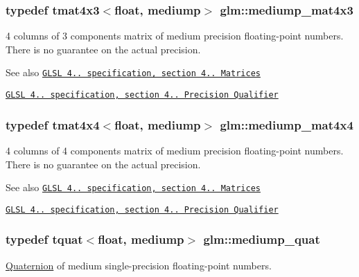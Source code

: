 \subsubsection[{mediump\+\_\+mat4x3}]{\setlength{\rightskip}{0pt plus 5cm}typedef tmat4x3$<$float, mediump$>$ {\bf glm\+::mediump\+\_\+mat4x3}}\label{namespaceglm_a25249273959c0b7c96e981ffdcd17dde}
4 columns of 3 components matrix of medium precision floating-\/point numbers. There is no guarantee on the actual precision.

\begin{DoxySeeAlso}{See also}
\href{http://www.opengl.org/registry/doc/GLSLangSpec.4.20.8.pdf}{\tt G\+L\+S\+L 4.. specification, section 4.. Matrices} 

\href{http://www.opengl.org/registry/doc/GLSLangSpec.4.20.8.pdf}{\tt G\+L\+S\+L 4.. specification, section 4.. Precision Qualifier} 
\end{DoxySeeAlso}
\hypertarget{namespaceglm_a8f7eeb38136787454a3a0fe6586d990b}{}
\subsubsection[{mediump\+\_\+mat4x4}]{\setlength{\rightskip}{0pt plus 5cm}typedef tmat4x4$<$float, mediump$>$ {\bf glm\+::mediump\+\_\+mat4x4}}\label{namespaceglm_a8f7eeb38136787454a3a0fe6586d990b}
4 columns of 4 components matrix of medium precision floating-\/point numbers. There is no guarantee on the actual precision.

\begin{DoxySeeAlso}{See also}
\href{http://www.opengl.org/registry/doc/GLSLangSpec.4.20.8.pdf}{\tt G\+L\+S\+L 4.. specification, section 4.. Matrices} 

\href{http://www.opengl.org/registry/doc/GLSLangSpec.4.20.8.pdf}{\tt G\+L\+S\+L 4.. specification, section 4.. Precision Qualifier} 
\end{DoxySeeAlso}
\hypertarget{namespaceglm_af74a4aa722b85bc0903d5e443be7030f}{}
\subsubsection[{mediump\+\_\+quat}]{\setlength{\rightskip}{0pt plus 5cm}typedef {\bf tquat}$<$float, mediump$>$ {\bf glm\+::mediump\+\_\+quat}}\label{namespaceglm_af74a4aa722b85bc0903d5e443be7030f}
\hyperlink{class_quaternion}{Quaternion} of medium single-\/precision floating-\/point numbers.

